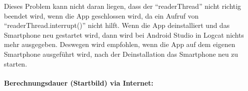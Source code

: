 \documentclass[12pt, onecolumn, notitlepage]{scrartcl}
\begin{document}
Dieses Problem kann nicht daran liegen, dass der \enquote{readerThread} nicht richtig beendet wird, wenn die App geschlossen wird, da ein Aufruf von \enquote{readerThread.interrupt()} nicht hilft. Wenn die App deinstalliert und das Smartphone neu gestartet wird, dann wird bei Android Studio in Logcat nichts mehr ausgegeben. Deswegen wird empfohlen, wenn die App auf dem eigenen Smartphone ausgeführt wird, nach der Deinstallation das Smartphone neu zu starten. \\ \\
\textbf{Berechnungsdauer (Startbild) via Internet:}
\begin{table}[H] 
	\centering
\end{table}
\end{document}
